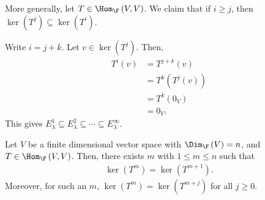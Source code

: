 \documentclass[10pt]{mypackage}
\begin{document}
More generally, let $T\in \Hom_{\F}\left(V,V\right)$. We claim that if $i\geq j$, then $\ker\left(T^j\right)\subseteq \ker\left(T^i\right)$.\newline

Write $i = j + k$. Let $v\in \ker\left(T^j\right)$. Then, 
\begin{align*}
  T^i\left(v\right) &= T^{j+k}\left(v\right)\\
                    &= T^{k}\left(T^j\left(v\right)\right)\\
                    &= T^{k}\left(0_V\right)\\
                    &= 0_V.
\end{align*}
This gives $E_{\lambda}^{1}\subseteq E_{\lambda}^{2}\subseteq \cdots\subseteq E_{\lambda}^{\infty}$.
\begin{lemma}
  Let $V$ be a finite dimensional vector space with $\Dim_{\F}\left(V\right) = n$, and $T\in \Hom_{\F}\left(V,V\right)$. Then, there exists $m$ with $1 \leq m \leq n$ such that
  \begin{align*}
    \ker\left(T^{m}\right) = \ker\left(T^{m+1}\right).
  \end{align*}
  Moreover, for such an $m$, $\ker\left(T^{m}\right) = \ker\left(T^{m+j}\right)$ for all $j\geq 0$.
\end{lemma}
\end{document}
